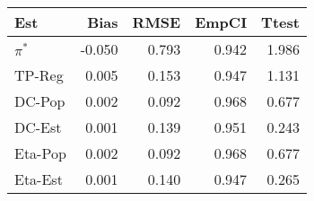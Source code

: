 
\begin{tabular}{lrrrr}
\toprule
Est & Bias & RMSE & EmpCI & Ttest\\
\midrule
$\pi^*$ & -0.050 & 0.793 & 0.942 & 1.986\\
TP-Reg & 0.005 & 0.153 & 0.947 & 1.131\\
DC-Pop & 0.002 & 0.092 & 0.968 & 0.677\\
DC-Est & 0.001 & 0.139 & 0.951 & 0.243\\
Eta-Pop & 0.002 & 0.092 & 0.968 & 0.677\\
\addlinespace
Eta-Est & 0.001 & 0.140 & 0.947 & 0.265\\
\bottomrule
\end{tabular}